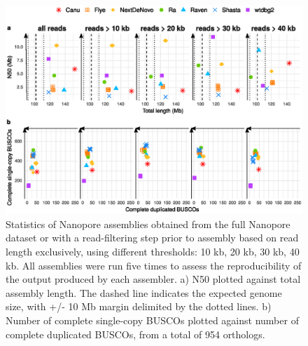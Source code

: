     \begin{figure}[ht]
    \centering
     \includegraphics[width=13.5cm]{fig/benchmark/supp_nanopore_replicates.eps}
   \caption{Statistics of Nanopore assemblies obtained from the full Nanopore dataset or with a read-filtering step prior to assembly based on read length exclusively, using different thresholds: 10 kb, 20 kb, 30 kb, 40 kb. All assemblies were run five times to assess the reproducibility of the output produced by each assembler. a) N50 plotted against total assembly length. The dashed line indicates the expected genome size, with +/- 10 Mb margin delimited by the dotted lines. b) Number of complete single-copy BUSCOs plotted against number of complete duplicated BUSCOs, from a total of 954 orthologs.}
   \label{fig:nanopore_replicates}
 \end{figure}

